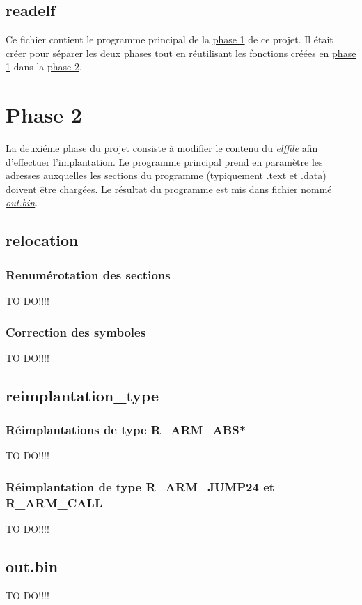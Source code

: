 \documentclass[a4paper]{article} %
\begin{document}

\subsection{readelf}
\label{sec:readelf}
Ce fichier contient le programme principal de la \hyperref[sec:phase1]{phase 1} de ce projet. 
Il était créer pour séparer les deux phases tout en réutilisant les fonctions créées en 
\hyperref[sec:phase1]{phase 1} dans la \hyperref[sec:phase2]{phase 2}.


\section{Phase 2}
\label{sec:phase2}
La deuxiéme phase du projet consiste à modifier le contenu du \hyperref[sec:elffile]{\textit{elffile}}
afin d'effectuer l'implantation. Le programme principal prend en paramètre 
les adresses auxquelles les sections du programme (typiquement .text et .data) 
doivent être chargées. Le résultat du programme est mis dans fichier nommé 
\hyperref[sec:bin]{\textit{out.bin}}. 


\subsection{relocation}

\subsubsection*{Renumérotation des sections}
TO DO!!!!

\subsubsection*{Correction des symboles}
TO DO!!!!

\subsection{reimplantation\_type}

\subsubsection*{Réimplantations de type R\_ARM\_ABS*}
TO DO!!!!

\subsubsection*{Réimplantation de type R\_ARM\_JUMP24 et R\_ARM\_CALL}
TO DO!!!!

\subsection{out.bin}
\label{sec:bin}
TO DO!!!!
\end{document}
